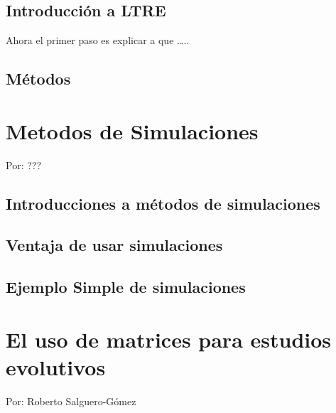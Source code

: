 \documentclass[
]{book}
\theoremstyle{definition}
\theoremstyle{definition}
\theoremstyle{definition}
\theoremstyle{definition}
\theoremstyle{remark}
\begin{document}
\hypertarget{introducciuxf3n-a-ltre}{%
\section{Introducción a LTRE}\label{introducciuxf3n-a-ltre}}

Ahora el primer paso es explicar a que \ldots..

\hypertarget{muxe9todos-1}{%
\section{Métodos}\label{muxe9todos-1}}

\hypertarget{metodos-de-simulaciones-1}{%
\chapter{Metodos de Simulaciones}\label{metodos-de-simulaciones-1}}

Por: ???

\hypertarget{introducciones-a-muxe9todos-de-simulaciones-1}{%
\section{Introducciones a métodos de simulaciones}\label{introducciones-a-muxe9todos-de-simulaciones-1}}

\hypertarget{ventaja-de-usar-simulaciones-1}{%
\section{Ventaja de usar simulaciones}\label{ventaja-de-usar-simulaciones-1}}

\hypertarget{ejemplo-simple-de-simulaciones-1}{%
\section{Ejemplo Simple de simulaciones}\label{ejemplo-simple-de-simulaciones-1}}

\hypertarget{el-uso-de-matrices-para-estudios-evolutivos}{%
\chapter{El uso de matrices para estudios evolutivos}\label{el-uso-de-matrices-para-estudios-evolutivos}}

Por: Roberto Salguero-Gómez

\hypertarget{section-1}{%
\section{}\label{section-1}}
\end{document}
